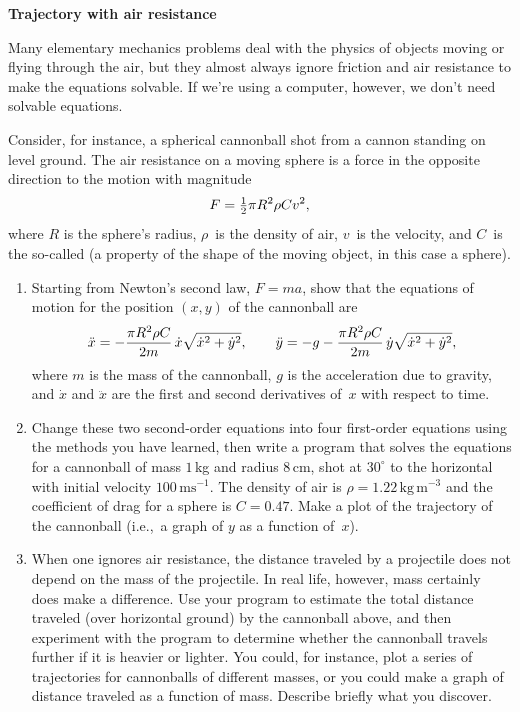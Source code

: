 \documentclass[12pt]{article}
\begin{document}
\begin{exercises}

\exercise \textbf{Trajectory with air resistance}

\exskip Many elementary mechanics problems deal with the physics of objects
moving or flying through the air, but they almost always ignore friction
and air resistance to make the equations solvable.  If we're using a
computer, however, we don't need solvable equations.

Consider, for instance, a spherical cannonball shot from a cannon standing
on level ground.  The air resistance on a moving sphere is a force in the
opposite direction to the motion with magnitude
\begin{displaymath}
F = \tfrac12 \pi R^2\rho C v^2,
\end{displaymath}
where $R$ is the sphere's radius, $\rho$~is the density of air, $v$~is the
velocity, and $C$~is the so-called  (a
property of the shape of the moving object, in this case a sphere).
\begin{enumerate}\setlength{\itemsep}{0pt}
\item Starting from Newton's second law, $F=ma$, show that the
  equations of motion for the position $(x,y)$ of the cannonball are
\begin{displaymath}
\ddot{x} = - {\pi R^2\rho C\over2m}\,
             \dot{x}\sqrt{\dot{x}^2+\dot{y}^2},
\qquad
\ddot{y} =  - g - {\pi R^2\rho C\over2m}\,
             \dot{y}\sqrt{\dot{x}^2+\dot{y}^2},
\end{displaymath}
where $m$ is the mass of the cannonball, $g$ is the acceleration due to
gravity, and $\dot{x}$ and $\ddot{x}$ are the first and second derivatives
of~$x$ with respect to time.
\item Change these two second-order equations into four first-order
  equations using the methods you have learned, then write a program that
  solves the equations for a cannonball of mass $1\,$kg and radius $8\,$cm,
  shot at $30^\circ$ to the horizontal with initial velocity
  $100\,\mathrm{ms}^{-1}$.  The density of air is
  $\rho=1.22\,\textrm{kg}\,\textrm{m}^{-3}$ and the coefficient of drag for
  a sphere is $C=0.47$.  Make a plot of the trajectory of the cannonball
  (i.e.,~a graph of $y$ as a function of~$x$).
\item When one ignores air resistance, the distance traveled by a
  projectile does not depend on the mass of the projectile.  In real life,
  however, mass certainly does make a difference.  Use your program to
  estimate the total distance traveled (over horizontal ground) by the
  cannonball above, and then experiment with the program to determine
  whether the cannonball travels further if it is heavier or lighter.  You
  could, for instance, plot a series of trajectories for cannonballs of
  different masses, or you could make a graph of distance traveled as a
  function of mass.  Describe briefly what you discover.
\end{enumerate}



\end{exercises}
\end{document}
